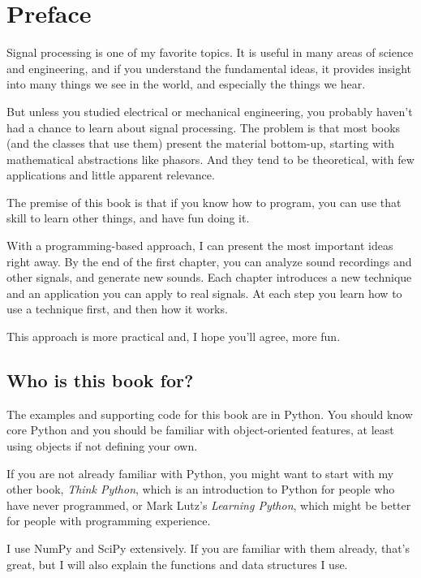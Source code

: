 \documentclass[12pt]{book}
\begin{document}
\fi

\chapter{Preface}
\label{preface}

Signal processing is one of my favorite topics.  It is useful
in many areas of science and engineering, and if you understand
the fundamental ideas, it provides insight into many things
we see in the world, and especially the things we hear.

But unless you studied electrical or mechanical engineering, you
probably haven't had a chance to learn about signal processing.  The
problem is that most books (and the classes that use them) present the
material bottom-up, starting with mathematical abstractions like
phasors.  And they tend to be theoretical, with few applications and
little apparent relevance.

The premise of this book is that if you know how to program, you
can use that skill to learn other things, and have fun doing it.

With a programming-based approach, I can present the most important
ideas right away.  By the end of the first chapter, you can analyze
sound recordings and other signals, and generate new sounds.  Each
chapter introduces a new technique and an application you can
apply to real signals.  At each step you learn how to use a
technique first, and then how it works.

This approach is more practical and, I hope you'll agree, more fun.


\section{Who is this book for?}

The examples and supporting code for this book are in Python.  You
should know core Python and you should be
familiar with object-oriented features, at least using objects if not
defining your own.

If you are not already familiar with Python, you might want to start
with my other book, {\it Think Python}, which is an introduction to
Python for people who have never programmed, or Mark
Lutz's {\it Learning Python}, which might be better for people with
programming experience.

I use NumPy and SciPy extensively.  If you are familiar with them
already, that's great, but I will also explain the functions
and data structures I use.
\end{document}
